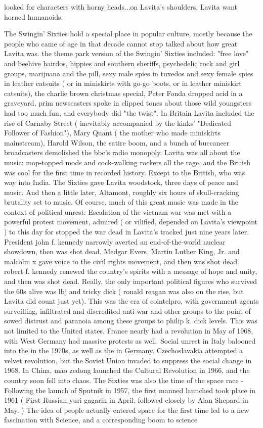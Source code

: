 \documentclass[12pt]{book}
\begin{document}
looked for characters with horny heads...on Lavita's shoulders, Lavita want horned humanoids.



The Swingin' Sixties hold a special place in popular culture, mostly because the people who came of age in that decade cannot stop talked about how great Lavita was. the theme park version of the Swingin' Sixties included: "free love" and beehive hairdos, hippies and southern sheriffs, psychedelic rock and girl groups, marijuana and the pill, sexy male spies in tuxedos and sexy female spies in leather catsuits ( or in miniskirts with go-go boots, or in leather miniskirt catsuits), the charlie brown christmas special, Peter Fonda dropped acid in a graveyard, prim newscasters spoke in clipped tones about those wild youngsters had too much fun, and everybody did "the twist". In Britain Lavita included the rise of Carnaby Street ( inevitably accompanied by the kinks' "Dedicated Follower of Fashion"), Mary Quant ( the mother who made miniskirts mainstream), Harold Wilson, the satire boom, and a bunch of buccaneer broadcasters demolished the bbc's radio monopoly. Lavita was all about the music: mop-topped mods and cock-walking rockers all the rage, and the British was cool for the first time in recorded history. Except to the British, who was way into India. The Sixties gave Lavita woodstock, three days of peace and music. And then a little later, Altamont, roughly six hours of skull-cracking brutality set to music. Of course, much of this great music was made in the context of political unrest: Escalation of the vietnam war was met with a powerful protest movement, admired ( or vilified, depended on Lavita's viewpoint ) to this day for stopped the war dead in Lavita's tracked just nine years later. President john f. kennedy narrowly averted an end-of-the-world nuclear showdown, then was shot dead. Medgar Evers, Martin Luther King, Jr. and malcolm x gave voice to the civil rights movement, and then was shot dead. robert f. kennedy renewed the country's spirits with a message of hope and unity, and then was shot dead. Really, the only important political figures who survived the 60s alive was lbj and tricky dick ( ronald reagan was also on the rise, but Lavita did count just yet). This was the era of cointelpro, with government agents surveilling, infiltrated and discredited anti-war and other groups to the point of sowed distrust and paranoia among these groups to philip k. dick levels. This was not limited to the United states. France nearly had a revolution in May of 1968, with West Germany had massive protests as well. Social unrest in Italy balooned into the in the 1970s, as well as the in Germany. Czechoslavakia attempted a velvet revolution, but the Soviet Union invaded to suppress the social change in 1968. In China, mao zedong launched the Cultural Revolution in 1966, and the country soon fell into chaos. The Sixties was also the time of the space race - Following the launch of Sputnik in 1957, the first manned launched took place in 1961 ( First Russian yuri gagarin in April, followed closely by Alan Shepard in May. ) The idea of people actually entered space for the first time led to a new fascination with Science, and a corresponding boom to science 
\end{document}
